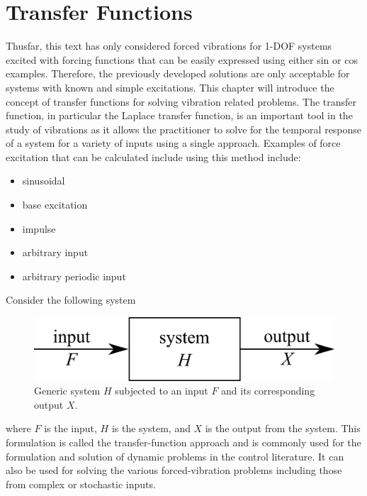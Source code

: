\documentclass[12pt,letter]{article}
\begin{document}
	
	\setcounter{section}{2}	
	\setcounter{figure}{0}    
	\renewcommand\thefigure{\thesection.\arabic{figure}}


	\section{Transfer Functions}

		Thusfar, this text has only considered forced vibrations for 1-DOF systems excited with forcing functions that can be easily expressed using either sin or cos examples. Therefore, the previously developed solutions are only acceptable for systems with known and simple excitations. This chapter will introduce the concept of transfer functions for solving vibration related problems. The transfer function, in particular the Laplace transfer function, is an important tool in the study of vibrations as it allows the practitioner to solve for the temporal response of a system for a variety of inputs using a single approach. Examples of force excitation that can be calculated include using this method include:
		\begin{itemize}
			\item sinusoidal
			\item base excitation
			\item impulse
			\item arbitrary input
			\item arbitrary periodic input
		\end{itemize}

			Consider the following system

			\begin{figure}[H]
				\centering
				\includegraphics[]{../figures/control_system.png}
				\caption{Generic system $H$ subjected to an input $F$ and its corresponding output $X$.}
				\label{fig:control_system}
			\end{figure}

			\noindent where $F$ is the input, $H$ is the system, and $X$ is the output from the system. This formulation is called the transfer-function approach and is commonly used for the formulation and solution of dynamic problems in the control literature. It can also be used for solving the various forced-vibration problems including those from complex or stochastic inputs. 
\end{document}

